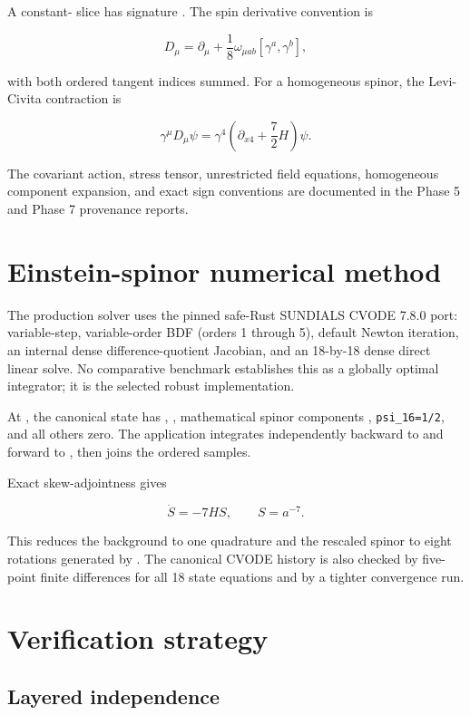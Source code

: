 \documentclass[11pt]{article}
\begin{document}
A constant-\texttt{} slice has signature \texttt{}. The spin derivative convention is

\[
D_\mu=\partial_\mu+\frac18\omega_{\mu ab}[\gamma^a,\gamma^b],
\]

with both ordered tangent indices summed. For a homogeneous spinor, the Levi-Civita contraction is

\[
\gamma^\mu D_\mu\psi
=\gamma^4\left(\partial_{x4}+\frac72H\right)\psi.
\]

The covariant action, stress tensor, unrestricted field equations, homogeneous component expansion, and exact sign conventions are documented in the Phase 5 and Phase 7 provenance reports.

\section{Einstein-spinor numerical method}

The production solver uses the pinned safe-Rust SUNDIALS CVODE 7.8.0 port: variable-step, variable-order BDF (orders 1 through 5), default Newton iteration, an internal dense difference-quotient Jacobian, and an 18-by-18 dense direct linear solve. No comparative benchmark establishes this as a globally optimal integrator; it is the selected robust implementation.

At \texttt{}, the canonical state has \texttt{}, \texttt{}, mathematical spinor components \texttt{}, \texttt{psi\_16=1\allowbreak{}/2}, and all others zero. The application integrates independently backward to \texttt{} and forward to \texttt{}, then joins the ordered samples.

Exact skew-adjointness gives

\[
\dot S=-7HS,
\qquad S=a^{-7}.
\]

This reduces the background to one quadrature and the rescaled spinor to eight rotations generated by \texttt{}. The canonical CVODE history is also checked by five-point finite differences for all 18 state equations and by a tighter convergence run.

\section{Verification strategy}

\subsection{Layered independence}
\end{document}

